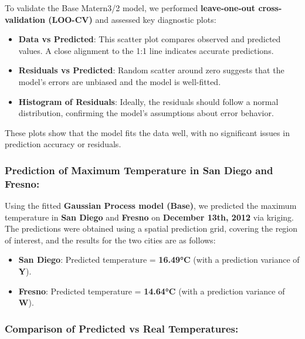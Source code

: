 \documentclass[
  11pt,
]{article}
\begin{document}
To validate the Base Matern3/2 model, we performed \textbf{leave-one-out
cross-validation (LOO-CV)} and assessed key diagnostic plots:

\begin{itemize}
\item
  \textbf{Data vs Predicted}: This scatter plot compares observed and
  predicted values. A close alignment to the 1:1 line indicates accurate
  predictions.
\item
  \textbf{Residuals vs Predicted}: Random scatter around zero suggests
  that the model's errors are unbiased and the model is well-fitted.
\item
  \textbf{Histogram of Residuals}: Ideally, the residuals should follow
  a normal distribution, confirming the model's assumptions about error
  behavior.
\end{itemize}

These plots show that the model fits the data well, with no significant
issues in prediction accuracy or residuals.

\subsubsection{Prediction of Maximum Temperature in San Diego and
Fresno:}\label{prediction-of-maximum-temperature-in-san-diego-and-fresno}

Using the fitted \textbf{Gaussian Process model (Base)}, we predicted
the maximum temperature in \textbf{San Diego} and \textbf{Fresno} on
\textbf{December 13th, 2012} via kriging. The predictions were obtained
using a spatial prediction grid, covering the region of interest, and
the results for the two cities are as follows:

\begin{itemize}
\item
  \textbf{San Diego}: Predicted temperature = \textbf{16.49°C} (with a
  prediction variance of \textbf{Y}).
\item
  \textbf{Fresno}: Predicted temperature = \textbf{14.64°C} (with a
  prediction variance of \textbf{W}).
\end{itemize}

\subsubsection{Comparison of Predicted vs Real
Temperatures:}\label{comparison-of-predicted-vs-real-temperatures}
\end{document}
